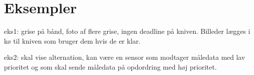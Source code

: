 \section{Eksempler}


eks1: grise på bånd, foto af flere grise, ingen deadline på kniven. Billeder lægges i kø til kniven som bruger dem hvis de er klar. 






eks2: skal vise alternation, kan være en sensor som modtager måledata med lav prioritet og som skal sende måledata på opdordring med høj prioritet. 
